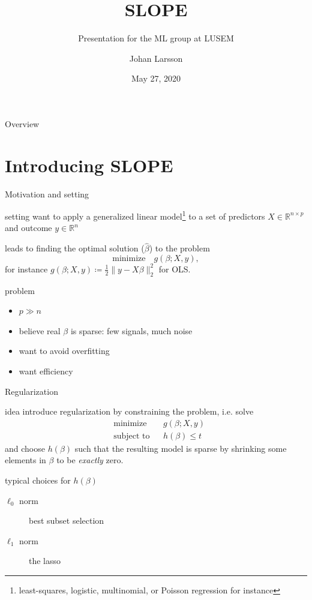 \documentclass[10pt]{beamer}
\title{SLOPE}
\subtitle{Presentation for the ML group at LUSEM}
\author{Johan Larsson}
\date{May 27, 2020}
\institute{Department of Statistics, Lund University}
\begin{document}

\begin{frame}{Overview}
\tableofcontents
\end{frame}

\section{Introducing SLOPE}

\begin{frame}{Motivation and setting}
\protect\hypertarget{sorted-l1}{}
\begin{block}{setting}
    want to apply a \alert{generalized linear model}\footnote{least-squares, logistic, multinomial, or Poisson regression for instance} to a set of predictors \(X \in \mathbb{R}^{n\times p}\) and outcome
    \(y \in \mathbb{R}^n\)\medskip
    
    leads to finding the optimal solution (\(\hat\beta\)) to the problem
    \[
        \text{minimize} \quad g(\beta;X,y),
    \]
    for instance \(g(\beta; X,y) \coloneqq \frac 12 \lVert y - X\beta \rVert_2^2\) for OLS.
\end{block}
\pause
\begin{block}{problem}
\begin{itemize}
    \item \(p \gg n\)
    \item believe \alert{real} \(\beta\) is sparse: few signals, much noise
    \item want to avoid overfitting
    \item want efficiency
\end{itemize}
\end{block}
\end{frame}

\begin{frame}{Regularization}
\begin{block}{idea}
introduce regularization by constraining the problem, i.e. solve
\[
    \begin{aligned}
        &\text{minimize}   && g(\beta;X,y)\\
        &\text{subject to} && h(\beta) \leq t
    \end{aligned}
\]
and choose \(h(\beta)\) such that the resulting model is \alert{sparse} by shrinking some 
elements in \(\beta\) to be \emph{exactly} zero.
\end{block}
\begin{block}{typical choices for \(h(\beta)\)}
\begin{description}
    \item[\(\ell_0\) norm] best subset selection
    \item[\(\ell_1\) norm] the lasso
\end{description}
\end{block}
\end{frame}
\end{document}

